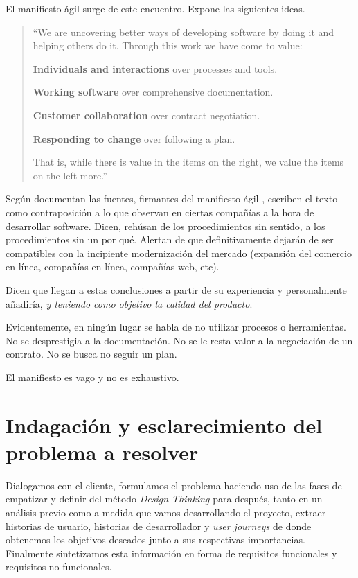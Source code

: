 El manifiesto ágil \cite{ManifiestoAgil} surge de este encuentro. Expone las siguientes ideas.

\begin{quote}
    \itshape{
    ``We are uncovering better ways of developing
    software by doing it and helping others do it.
    Through this work we have come to value:
    
    \textbf{Individuals and interactions} over processes and tools.

    \textbf{Working software} over comprehensive documentation.

    \textbf{Customer collaboration} over contract negotiation.

    \textbf{Responding to change} over following a plan.
    
    That is, while there is value in the items on
    the right, we value the items on the left more.''
    }
\end{quote}

Según documentan las fuentes, firmantes del manifiesto ágil \cite{ManifiestoAgil}, 
escriben el texto como contraposición a lo que observan en ciertas compañías a la
hora de desarrollar software. Dicen, rehúsan de los procedimientos sin sentido,
a los procedimientos sin un por qué. Alertan de que definitivamente dejarán de ser
compatibles con la incipiente modernización del mercado (expansión del comercio en
línea, compañías en línea, compañías web, etc). \cite{HistoriaManifiestoAgilJim}

Dicen que llegan a estas conclusiones a partir de su experiencia \cite{HistoriaManifiestoAgilJim}
y personalmente añadiría, \textit{y teniendo como objetivo la calidad del producto}.

Evidentemente, en ningún lugar se habla de no utilizar procesos o herramientas.
No se desprestigia a la documentación. No se le resta valor a la negociación
de un contrato. No se busca no seguir un plan.

El manifiesto es vago y no es exhaustivo.

\section{Indagación y esclarecimiento del problema a resolver}

Dialogamos con el cliente, formulamos el problema haciendo uso de las fases de
empatizar y definir del método \textit{Design Thinking} para después, tanto en un análisis
previo como a medida que vamos desarrollando el proyecto, extraer historias de usuario, historias de
desarrollador y \textit{user journeys} de donde obtenemos los objetivos deseados
junto a sus respectivas importancias.
Finalmente sintetizamos esta información en forma de requisitos funcionales y
requisitos no funcionales.


